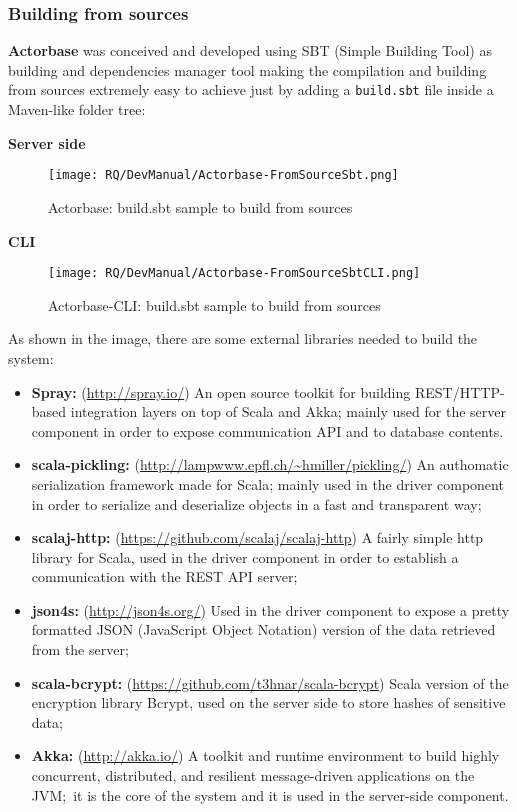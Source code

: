 \documentclass{scalatekids-article}
\begin{document}
\subsubsection{Building from sources}

\textbf{Actorbase} was conceived and developed using SBT (Simple Building Tool) as building and dependencies
manager tool making the compilation and building from sources extremely easy to achieve just by adding a
\verb=build.sbt= file inside a Maven-like folder tree:

\textbf{Server side}

\begin{figure}[H]
  \begin{center}
    \texttt{[image: RQ/DevManual/Actorbase-FromSourceSbt.png]}
    \caption{Actorbase: build.sbt sample to build from sources}
  \end{center}
\end{figure}

\textbf{CLI}

\begin{figure}[H]
  \begin{center}
    \texttt{[image: RQ/DevManual/Actorbase-FromSourceSbtCLI.png]}
    \caption{Actorbase-CLI: build.sbt sample to build from sources}
  \end{center}
\end{figure}

As shown in the image, there are some external libraries needed to build the system:
\begin{itemize}
\item \textbf{Spray:} (\url{http://spray.io/}) An open source toolkit for building REST/HTTP-based
integration layers on top of Scala and Akka; mainly used for the server
component in order to expose communication API and to
 database contents.
\item \textbf{scala-pickling:} (\url{http://lampwww.epfl.ch/~hmiller/pickling/}) An authomatic serialization framework made for
Scala; mainly used in the driver component in order to serialize and
deserialize objects in a fast and transparent way;
\item \textbf{scalaj-http:} (\url{https://github.com/scalaj/scalaj-http}) A fairly simple http library for Scala, used in the
driver component in order to establish a communication with the REST API server;\
\item \textbf{json4s:} (\url{http://json4s.org/}) Used in the driver component to expose a pretty formatted
JSON (JavaScript Object Notation) version of the data retrieved from the server;
\item \textbf{scala-bcrypt:} (\url{https://github.com/t3hnar/scala-bcrypt}) Scala version of the encryption library Bcrypt,
used on the server side to store hashes of sensitive data;
\item \textbf{Akka:} (\url{http://akka.io/}) A toolkit and runtime environment to build highly concurrent,
distributed, and resilient message-driven applications on the JVM;\ it is the core of
the system and it is used in the server-side component.
\end{itemize}
\end{document}
